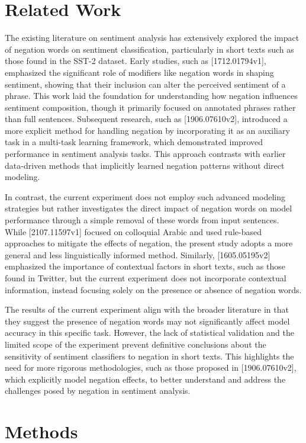\documentclass{article}
\begin{document}
\section{Related Work}
The existing literature on sentiment analysis has extensively explored the impact of negation words on sentiment classification, particularly in short texts such as those found in the SST-2 dataset. Early studies, such as [1712.01794v1], emphasized the significant role of modifiers like negation words in shaping sentiment, showing that their inclusion can alter the perceived sentiment of a phrase. This work laid the foundation for understanding how negation influences sentiment composition, though it primarily focused on annotated phrases rather than full sentences. Subsequent research, such as [1906.07610v2], introduced a more explicit method for handling negation by incorporating it as an auxiliary task in a multi-task learning framework, which demonstrated improved performance in sentiment analysis tasks. This approach contrasts with earlier data-driven methods that implicitly learned negation patterns without direct modeling. 

In contrast, the current experiment does not employ such advanced modeling strategies but rather investigates the direct impact of negation words on model performance through a simple removal of these words from input sentences. While [2107.11597v1] focused on colloquial Arabic and used rule-based approaches to mitigate the effects of negation, the present study adopts a more general and less linguistically informed method. Similarly, [1605.05195v2] emphasized the importance of contextual factors in short texts, such as those found in Twitter, but the current experiment does not incorporate contextual information, instead focusing solely on the presence or absence of negation words. 

The results of the current experiment align with the broader literature in that they suggest the presence of negation words may not significantly affect model accuracy in this specific task. However, the lack of statistical validation and the limited scope of the experiment prevent definitive conclusions about the sensitivity of sentiment classifiers to negation in short texts. This highlights the need for more rigorous methodologies, such as those proposed in [1906.07610v2], which explicitly model negation effects, to better understand and address the challenges posed by negation in sentiment analysis.
\section{Methods}
\end{document}
